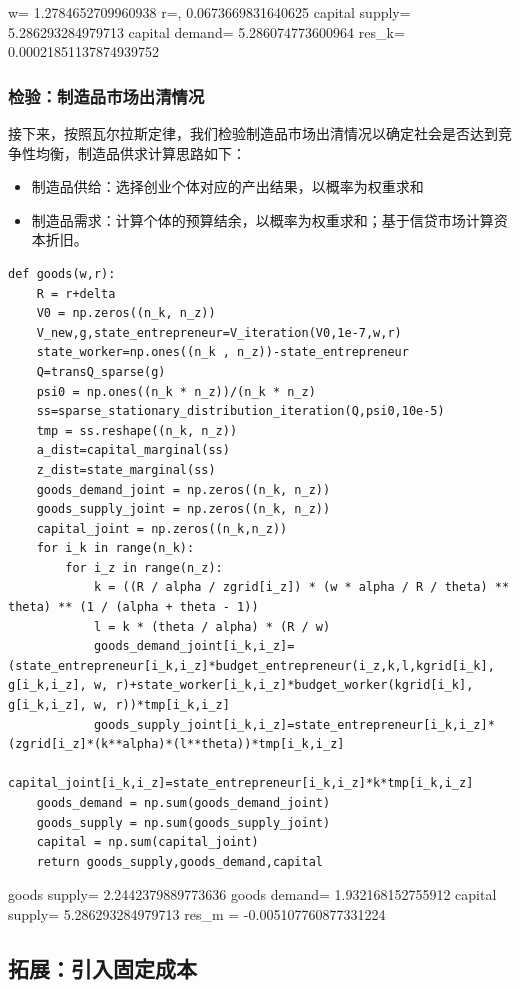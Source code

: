 \documentclass[a4paper, 12pt]{ctexart}
\begin{document}
w= 1.2784652709960938 r=, 0.0673669831640625 capital supply= 5.286293284979713 capital demand= 5.286074773600964 res\_k= 0.00021851137874939752


\subsubsection{检验：制造品市场出清情况}
接下来，按照瓦尔拉斯定律，我们检验制造品市场出清情况以确定社会是否达到竞争性均衡，制造品供求计算思路如下：
\begin{itemize}
    \item 制造品供给：选择创业个体对应的产出结果，以概率为权重求和
    \item 制造品需求：计算个体的预算结余，以概率为权重求和；基于信贷市场计算资本折旧。
\end{itemize}
\begin{lstlisting}
def goods(w,r):
    R = r+delta
    V0 = np.zeros((n_k, n_z))
    V_new,g,state_entrepreneur=V_iteration(V0,1e-7,w,r)
    state_worker=np.ones((n_k , n_z))-state_entrepreneur
    Q=transQ_sparse(g)
    psi0 = np.ones((n_k * n_z))/(n_k * n_z)
    ss=sparse_stationary_distribution_iteration(Q,psi0,10e-5)
    tmp = ss.reshape((n_k, n_z))
    a_dist=capital_marginal(ss)
    z_dist=state_marginal(ss)
    goods_demand_joint = np.zeros((n_k, n_z))
    goods_supply_joint = np.zeros((n_k, n_z))
    capital_joint = np.zeros((n_k,n_z))        
    for i_k in range(n_k):
        for i_z in range(n_z):
            k = ((R / alpha / zgrid[i_z]) * (w * alpha / R / theta) ** theta) ** (1 / (alpha + theta - 1))
            l = k * (theta / alpha) * (R / w)
            goods_demand_joint[i_k,i_z]=(state_entrepreneur[i_k,i_z]*budget_entrepreneur(i_z,k,l,kgrid[i_k], g[i_k,i_z], w, r)+state_worker[i_k,i_z]*budget_worker(kgrid[i_k], g[i_k,i_z], w, r))*tmp[i_k,i_z]
            goods_supply_joint[i_k,i_z]=state_entrepreneur[i_k,i_z]*(zgrid[i_z]*(k**alpha)*(l**theta))*tmp[i_k,i_z]
            capital_joint[i_k,i_z]=state_entrepreneur[i_k,i_z]*k*tmp[i_k,i_z]
    goods_demand = np.sum(goods_demand_joint)
    goods_supply = np.sum(goods_supply_joint)
    capital = np.sum(capital_joint)
    return goods_supply,goods_demand,capital
\end{lstlisting}

goods supply= 2.2442379889773636 goods demand= 1.932168152755912 capital supply= 5.286293284979713 res\_m = -0.005107760877331224
\subsection{拓展：引入固定成本}
\end{document}
